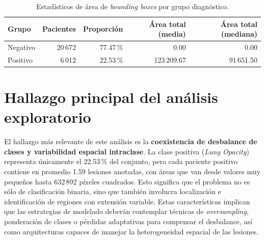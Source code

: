\documentclass[11pt,spanish]{article}
\begin{document}
\begin{table}[H]
\centering
\small
\caption{Estadísticos de área de \textit{bounding boxes} por grupo diagnóstico.}
\label{tab:grupo}
\begin{tabular}{lrrrr}
\toprule
\textbf{Grupo} & \textbf{Pacientes} & \textbf{Proporción}
               & \textbf{Área total (media)} & \textbf{Área total (mediana)} \\
\midrule
Negativo & 20\,672 & 77.47\,\% & 0.00       & 0.00 \\
Positivo &  6\,012 & 22.53\,\% & 123\,209.67 & 91\,651.50 \\
\bottomrule
\end{tabular}
\end{table}

\section{Hallazgo principal del análisis exploratorio}

El hallazgo más relevante de este análisis es la \textbf{coexistencia de desbalance de clases
y variabilidad espacial intraclase}. La clase positiva (\textit{Lung Opacity}) representa
únicamente el 22.53\,\% del conjunto, pero cada paciente positivo contiene en promedio 1.59
lesiones anotadas, con áreas que van desde valores muy pequeños hasta 632\,892 píxeles
cuadrados. Esto significa que el problema no es sólo de clasificación binaria, sino que también
involucra localización e identificación de regiones con extensión variable. Estas características
implican que las estrategias de modelado deberán contemplar técnicas de
\textit{oversampling}, ponderación de clases o pérdidas adaptativas para compensar el
desbalance, así como arquitecturas capaces de manejar la heterogeneidad espacial de las lesiones.
\end{document}
